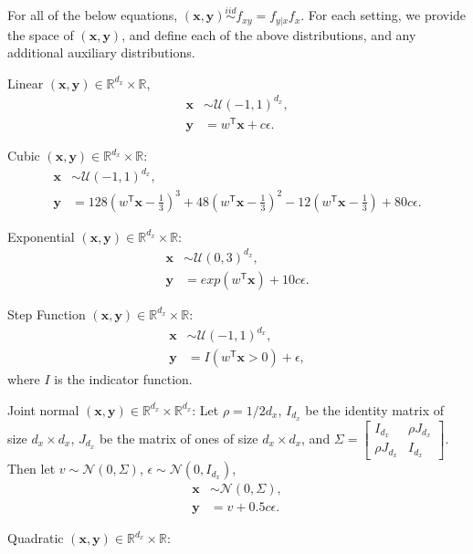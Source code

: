 \documentclass[11pt]{article}
\providecommand{\mb}[1]{\boldsymbol{#1}}
\providecommand{\mc}[1]{\mathcal{#1}}
\newcommand{\Real}{\mathbb{R}}
\newcommand{\T}{^{\ensuremath{\mathsf{T}}}}           %
\newcommand{\mbx}{\ensuremath{\mb{x}}}
\newcommand{\mby}{\ensuremath{\mb{y}}}
\begin{document}
For all of the below equations, $(\mbx,\mby) \overset{iid}{\sim} f_{xy} = f_{y|x} f_x$. For each setting, we provide the space of $(\mbx,\mby)$, and define each of the above distributions, and any additional auxiliary distributions.

\setcounter{equation}{0}
\begin{compactenum}
\item Linear $(\mbx,\mby) \in \Real^{d_{x}} \times \Real$,
\begin{align*}
\mbx &\sim \mc{U}(-1,1)^{d_{x}},\\
\mby &=w\T \mbx+c\epsilon.
\end{align*}
\item Cubic $(\mbx,\mby) \in \Real^{d_{x}} \times \Real$:
\begin{align*}
\mbx &\sim \mc{U}(-1,1)^{d_{x}}, \\
\mby &=128(w\T \mbx-\tfrac{1}{3})^3+48(w\T \mbx-\tfrac{1}{3})^2-12(w\T \mbx-\tfrac{1}{3})+80c\epsilon.
\end{align*}
\item Exponential $(\mbx,\mby) \in \Real^{d_{x}} \times \Real$:
\begin{align*}
\mbx &\sim \mc{U}(0,3)^{d_{x}}, \\
\mby &=exp(w\T \mbx)+10c\epsilon.
\end{align*}
\item Step Function $(\mbx,\mby) \in \Real^{d_{x}} \times \Real$:
\begin{align*}
\mbx &\sim \mc{U}(-1,1)^{d_{x}},\\
\mby &={I}(w\T \mbx>0)+\epsilon,
\end{align*}
where ${I}$ is the indicator function.
\item Joint normal $(\mbx,\mby) \in \Real^{d_{x}} \times \Real^{d_{x}}$: Let $\rho=1/2d_{x}$, $I_{d_{x}}$ be the identity matrix of size $d_{x} \times d_{x}$, $J_{d_{x}}$ be the matrix of ones of size $d_{x} \times d_{x}$, and $\Sigma = \begin{bmatrix} I_{d_{x}}&\rho J_{d_{x}}\\ \rho J_{d_{x}}&I_{d_{x}} \end{bmatrix}$. Then let $v \sim \mc{N}(0, \Sigma)$, $\epsilon \sim \mc{N}(0, I_{d_{x}})$,
\begin{align*}
\mbx &\sim \mc{N}(0, \Sigma),\\
\mby &=v+0.5c\epsilon.
\end{align*}
\item Quadratic $(\mbx,\mby) \in \Real^{d_{x}} \times \Real$:
\begin{align*}

\end{align*}
\end{compactenum}
\end{document}
